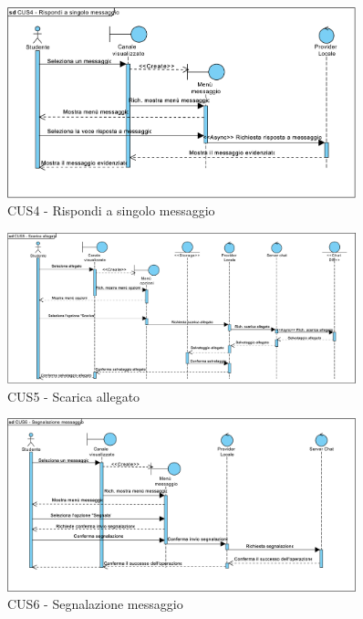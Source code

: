 \begin{figure}
	\centering
	\includegraphics[width=0.9\textwidth]{imgs/gruppo6/sequence/CUS4_rispondi_a_singolo_messaggio.pdf}
	\caption{CUS4 - Rispondi a singolo messaggio}
	\label{fig:seq-cus4}
\end{figure}

\begin{figure}
	\centering
	\includegraphics[width=0.9\textwidth]{imgs/gruppo6/sequence/CUS5_scarica_allegato.pdf}
	\caption{CUS5 - Scarica allegato}
	\label{fig:seq-cus5}
\end{figure}

\begin{figure}
	\centering
	\includegraphics[width=0.9\textwidth]{imgs/gruppo6/sequence/CUS6_segnalazione_messaggio.pdf}
	\caption{CUS6 - Segnalazione messaggio}
	\label{fig:seq-cus6}
\end{figure}

